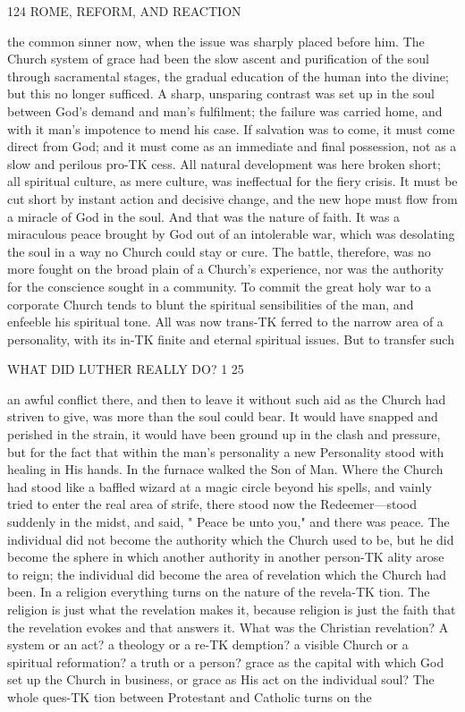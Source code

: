 \documentclass[12pt,a5paper,twoside]{book}
\begin{document}
124 ROME, REFORM, AND REACTION 

the common sinner now, when the issue was sharply 
placed before him. The Church system of grace had 
been the slow ascent and purification of the soul through 
sacramental stages, the gradual education of the human 
into the divine; but this no longer sufficed. A sharp, 
unsparing contrast was set up in the soul between 
God's demand and man's fulfilment; the failure was 
carried home, and with it man's impotence to mend 
his case. If salvation was to come, it must come 
direct from God; and it must come as an immediate 
and final possession, not as a slow and perilous pro-TK
cess. All natural development was here broken short; 
all spiritual culture, as mere culture, was ineffectual 
for the fiery crisis. It must be cut short by instant 
action and decisive change, and the new hope must 
flow from a miracle of God in the soul. And that 
was the nature of faith. It was a miraculous peace 
brought by God out of an intolerable war, which was 
desolating the soul in a way no Church could stay or 
cure. The battle, therefore, was no more fought on 
the broad plain of a Church's experience, nor was the 
authority for the conscience sought in a community. 
To commit the great holy war to a corporate Church 
tends to blunt the spiritual sensibilities of the man, 
and enfeeble his spiritual tone. All was now trans-TK
ferred to the narrow area of a personality, with its in-TK
finite and eternal spiritual issues. But to transfer such 



WHAT DID LUTHER REALLY DO? 1 25 

an awful conflict there, and then to leave it without 
such aid as the Church had striven to give, was more 
than the soul could bear. It would have snapped and 
perished in the strain, it would have been ground 
up in the clash and pressure, but for the fact that 
within the man's personality a new Personality stood 
with healing in His hands. In the furnace walked 
the Son of Man. Where the Church had stood like 
a baffled wizard at a magic circle beyond his spells, 
and vainly tried to enter the real area of strife, there 
stood now the Redeemer---stood suddenly in the 
midst, and said, " Peace be unto you," and there was 
peace. The individual did not become the authority 
which the Church used to be, but he did become the 
sphere in which another authority in another person-TK
ality arose to reign; the individual did become the 
area of revelation which the Church had been. In 
a religion everything turns on the nature of the revela-TK
tion. The religion is just what the revelation makes 
it, because religion is just the faith that the revelation 
evokes and that answers it. What was the Christian 
revelation? A system or an act? a theology or a re-TK
demption? a visible Church or a spiritual reformation? 
a truth or a person? grace as the capital with which 
God set up the Church in business, or grace as 
His act on the individual soul? The whole ques-TK
tion between Protestant and Catholic turns on the 
\end{document}
